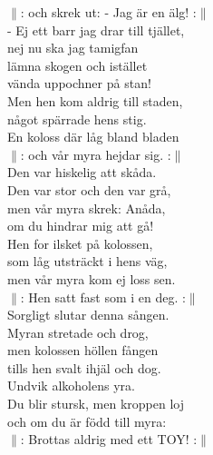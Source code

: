 \documentclass[a6paper, 10pt, twoside]{article}
\begin{document}
\begin{lyrics}
$\|$: och skrek ut: - Jag är en älg! :$\|$
\vspace{5pt}\\  
- Ej ett barr jag drar till tjället,\\ 
nej nu ska jag tamigfan\\ 
lämna skogen och istället\\ 
vända uppochner på stan!\\ 
Men hen kom aldrig till staden,\\ 
något spärrade hens stig.\\ 
En koloss där låg bland bladen\\ 
$\|$: och vår myra hejdar sig. :$\|$
\vspace{5pt}\\  
Den var hiskelig att skåda.\\ 
Den var stor och den var grå,\\ 
men vår myra skrek: Anåda,\\ 
om du hindrar mig att gå!\\ 
Hen for ilsket på kolossen,\\ 
som låg utsträckt i hens väg,\\ 
men vår myra kom ej loss sen.\\ 
$\|$: Hen satt fast som i en deg. :$\|$
\vspace{5pt}\\  
Sorgligt slutar denna sången.\\ 
Myran stretade och drog,\\ 
men kolossen höllen fången\\ 
tills hen svalt ihjäl och dog.\\ 
Undvik alkoholens yra.\\ 
Du blir stursk, men kroppen loj\\ 
och om du är född till myra:\\ 
$\|$: Brottas aldrig med ett TOY! :$\|$ 
\end{lyrics}
\end{document}
